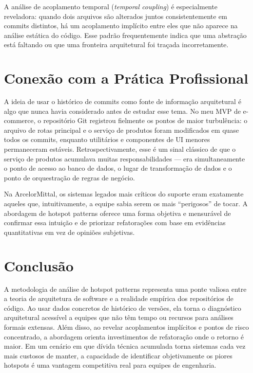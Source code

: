\documentclass[12pt,a4paper]{article}
\begin{document}
A an\'alise de acoplamento temporal (\textit{temporal coupling}) \'e especialmente
reveladora: quando dois arquivos s\~ao alterados juntos consistentemente em commits
distintos, h\'a um acoplamento impl\'icito entre eles que n\~ao aparece na an\'alise
est\'atica do c\'odigo. Esse padr\~ao frequentemente indica que uma abstra\c{c}\~ao
est\'a faltando ou que uma fronteira arquitetural foi tra\c{c}ada incorretamente.

\section{Conex\~ao com a Pr\'atica Profissional}

A ideia de usar o hist\'orico de commits como fonte de informa\c{c}\~ao
arquitetural \'e algo que nunca havia considerado antes de estudar esse tema. No
meu MVP de e-commerce, o reposit\'orio Git registrou fiel\-mente os pontos de
maior turbul\^encia: o arquivo de rotas principal e o servi\c{c}o de produtos
foram modificados em quase todos os commits, enquanto utilit\'arios e componentes
de UI menores permaneceram est\'aveis. Retrospectivamente, esse \'e um sinal
cl\'assico de que o servi\c{c}o de produtos acumulava muitas responsabilidades
--- era simultaneamente o ponto de acesso ao banco de dados, o lugar de transforma\c{c}\~ao
de dados e o ponto de orquestra\c{c}\~ao de regras de neg\'ocio.

Na ArcelorMittal, os sistemas legados mais cr\'iticos do suporte eram exatamente
aqueles que, intuitivamente, a equipe sabia serem os mais ``perigosos'' de tocar.
A abordagem de hotspot patterns oferece uma forma objetiva e mensur\'avel de
confirmar essa intui\c{c}\~ao e de priorizar refatora\c{c}\~oes com base em
evid\^encias quantitativas em vez de opini\~oes subjetivas.

\section{Conclus\~ao}

A metodologia de an\'alise de hotspot patterns representa uma ponte valiosa entre
a teoria de arquitetura de software e a realidade empírica dos reposit\'orios de
c\'odigo. Ao usar dados concretos de hist\'orico de vers\~oes, ela torna o
diagn\'ostico arquitetural acess\'ivel a equipes que n\~ao t\^em tempo ou recursos
para an\'alises formais extensas. Al\'em disso, ao revelar acoplamentos impl\'icitos
e pontos de risco concentrado, a abordagem orienta investimentos de refatora\c{c}\~ao
onde o retorno \'e maior. Em um cen\'ario em que d\'ivida t\'ecnica acumulada
torna sistemas cada vez mais custosos de manter, a capacidade de identificar
objetivamente os piores hotspots \'e uma vantagem competitiva real para equipes
de engenharia.
\end{document}

